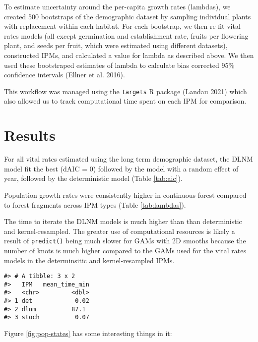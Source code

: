\documentclass[
]{article}
\begin{document}
To estimate uncertainty around the per-capita growth rates (lambdas), we created 500 bootstraps of the demographic dataset by sampling individual plants with replacement within each habitat.
For each bootstrap, we then re-fit vital rates models (all except germination and establishment rate, fruits per flowering plant, and seeds per fruit, which were estimated using different datasets), constructed IPMs, and calculated a value for lambda as described above.
We then used these bootstraped estimates of lambda to calculate bias corrected 95\% confidence intervals (Ellner et al. 2016).

This workflow was managed using the \texttt{targets} R package (Landau 2021) which also allowed us to track computational time spent on each IPM for comparison.

\hypertarget{results}{%
\section{Results}\label{results}}

For all vital rates estimated using the long term demographic dataset, the DLNM model fit the best (dAIC = 0) followed by the model with a random effect of year, followed by the deterministic model (Table \ref{tab:aic}).

Population growth rates were consistently higher in continuous forest compared to forest fragments across IPM types (Table \ref{tab:lambdas}).

The time to iterate the DLNM models is much higher than than deterministic and kernel-resampled.
The greater use of computational resources is likely a result of \texttt{predict()} being much slower for GAMs with 2D smooths because the number of knots is much higher compared to the GAMs used for the vital rates models in the determinsitic and kernel-resampled IPMs.

\begin{verbatim}
#> # A tibble: 3 x 2
#>   IPM   mean_time_min
#>   <chr>         <dbl>
#> 1 det            0.02
#> 2 dlnm          87.1 
#> 3 stoch          0.07
\end{verbatim}

Figure \ref{fig:pop-states} has some interesting things in it:
\end{document}
